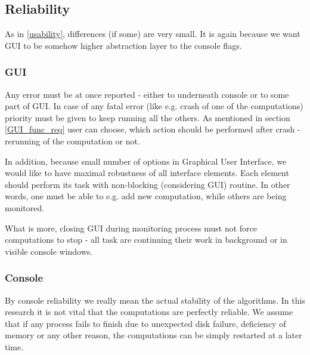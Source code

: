 \documentclass{article}
\begin{document}

%
%
\subsection{Reliability}
As in \ref{usability}, differences (if some) are very small. It is again because we want GUI to be somehow higher abstraction layer to the console flags.


\subsubsection{GUI}
Any error must be at once reported - either to underneath console or to some part of GUI. In case of any fatal error (like e.g. crash of one of the computations) priority must be given to keep running all the others. As mentioned in section \ref{GUI_func_req} user can choose, which action should be performed after crash - rerunning of the computation or not. 

In addition, because small number of options in Graphical User Interface, we would like to have maximal robustness of all interface elements. Each element should perform its task with non-blocking (considering GUI) routine. In other words, one must be able to e.g. add new computation, while others are being monitored.

What is more, closing GUI during monitoring process must not force computations to stop - all task are continuing their work in background or in visible console windows.


\subsubsection{Console}
By console reliability we really mean the actual stability of the algorithms. In this research it is not vital that the computations are perfectly reliable. We assume that if any process fails to finish due to unexpected disk failure, deficiency of memory or any other reason, the computations can be simply restarted at a later time.

\end{document}
